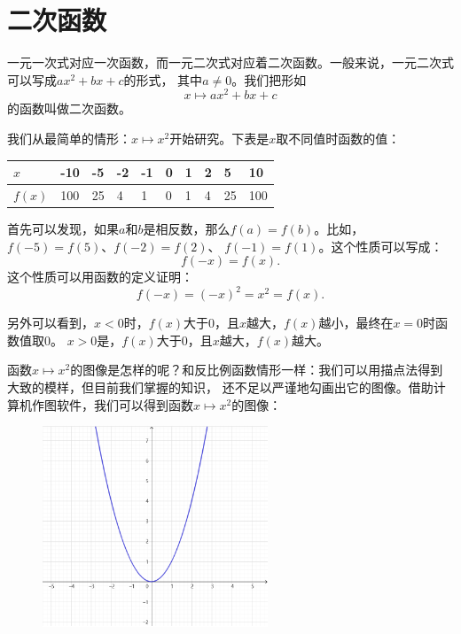 \documentclass[12pt,UTF8]{ctexbook}
\begin{document}
\section{二次函数}
一元一次式对应一次函数，而一元二次式对应着二次函数。一般来说，一元二次式可以写成$ax^2 + bx + c$的形式，
其中$a \neq 0$。我们把形如
$$ x \mapsto ax^2 + bx + c$$
的函数叫做二次函数。

我们从最简单的情形：$x\mapsto x^2$开始研究。下表是$x$取不同值时函数的值：

\begin{center}
    \begin{tabular}{| p{2em}<{\centering} | p{1.8em}<{\centering} | p{1.8em}<{\centering} | p{1.8em}<{\centering} | p{1.8em}<{\centering} | p{1.8em}<{\centering} | p{1.8em}<{\centering} | p{1.8em}<{\centering} | p{1.8em}<{\centering} | p{1.8em}<{\centering} |}
        \hline
        $x$ & -10 & -5 & -2 & -1 & 0 & 1 & 2 & 5 & 10 \\ [0.5ex] 
        \hline
        $f(x)$ & 100 & 25 & 4 & 1 & 0 & 1 & 4 & 25 & 100 \\   
        \hline
    \end{tabular}
\end{center}

首先可以发现，如果$a$和$b$是相反数，那么$f(a) = f(b)$。比如，$f(-5) = f(5)$、$f(-2) = f(2)$、
$f(-1) = f(1)$。这个性质可以写成：
$$ f(-x) = f(x).$$
这个性质可以用函数的定义证明：
$$ f(-x) = (-x)^2 = x^2 = f(x).$$

另外可以看到，$x<0$时，$f(x)$大于$0$，且$x$越大，$f(x)$越小，最终在$x=0$时函数值取$0$。
$x > 0$是，$f(x)$大于$0$，且$x$越大，$f(x)$越大。

函数$x\mapsto x^2$的图像是怎样的呢？和反比例函数情形一样：我们可以用描点法得到大致的模样，但目前我们掌握的知识，
还不足以严谨地勾画出它的图像。借助计算机作图软件，我们可以得到函数$x\mapsto x^2$的图像：

\begin{figure}[h] %
    \vspace{8pt}
    \centering
    \includegraphics[width=0.6\textwidth]{tu/二次函数1.png}
\end{figure}
\end{document}
